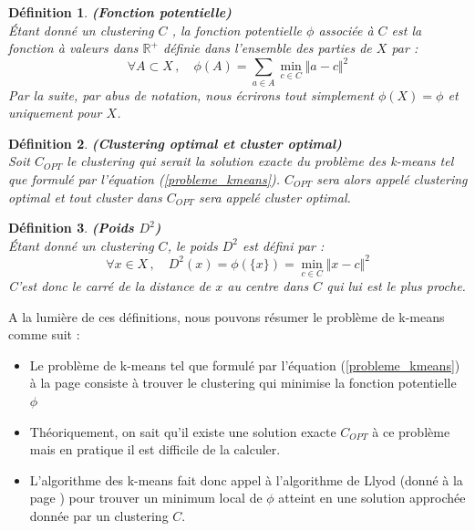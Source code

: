 \documentclass[12pt,a4paper]{book}
\newtheorem{env_definition}{Définition}
\newcommand{\R}{\mathbb{R}}
\newcommand{\1}{\mathds{1}}
\begin{document}
	\begin{env_definition}\label{fonction_potentielle}
		\textbf{(Fonction potentielle)}\\
		Étant donné un clustering $C$ , la fonction potentielle $\phi$ associée à $C$ est la fonction à valeurs dans $\R^+$ définie dans l'ensemble des parties de $X$ par :
		$$
			\forall A \subset X \,, \quad \phi(A) = \sum_{a \in A} \min_{c \in C} \Vert a - c \Vert^2
		$$
		Par la suite, par abus de notation, nous écrirons tout simplement $\phi(X) = \phi$ et uniquement pour $X$.
	\end{env_definition}
	
	\begin{env_definition}\label{clustering_optimal}
		\textbf{(Clustering optimal et cluster optimal)}\\
		Soit $C_{OPT}$ le clustering qui serait la solution exacte du problème des k-means tel que formulé par l'équation (\ref{probleme_kmeans}). $C_{OPT}$ sera alors appelé clustering optimal et tout cluster dans $C_{OPT}$ sera appelé cluster optimal.
	\end{env_definition}
	
	\begin{env_definition}\label{poids_d}
		\textbf{(Poids $D^2$)}\\
		Étant donné un clustering $C$, le poids $D^2$ est défini par :
		$$
			\forall x \in X \,, \quad D^2(x) = \phi(\{x\}) = \min_{c \in C} \Vert x - c \Vert^2
		$$
		C'est donc le carré de la distance de $x$ au centre dans $C$ qui lui est le plus proche.
	\end{env_definition}
	
	A la lumière de ces définitions, nous pouvons résumer le problème de k-means comme suit :
	\begin{itemize}
		\item Le problème de k-means tel que formulé par l'équation (\ref{probleme_kmeans}) à la page \pageref{probleme_kmeans} consiste à trouver le clustering qui minimise la fonction potentielle $\phi$
		\item Théoriquement, on sait qu'il existe une solution exacte $C_{OPT}$ à ce problème mais en pratique il est difficile de la calculer.
		\item L'algorithme des k-means fait donc appel à l'algorithme de Llyod (donné à la page \pageref{algo_lloyd}) pour trouver un minimum local de $\phi$ atteint en une solution approchée donnée par un clustering $C$. \\
	\end{itemize}
\end{document}
